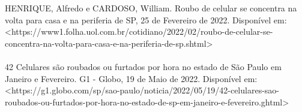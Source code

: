 

\noindent
HENRIQUE, Alfredo e CARDOSO, William. Roubo de celular se concentra na volta para casa e na periferia de SP, 25 de Fevereiro de 2022. 
Disponível em: <https://www1.folha.uol.com.br/cotidiano/2022/02/roubo-de-celular-se-concentra-na-volta-para-casa-e-na-periferia-de-sp.shtml> 
\\ \\
42 Celulares são roubados ou furtados por hora no estado de São Paulo em Janeiro e Fevereiro. G1 - Globo, 19 de Maio de 2022.
Disponível em: <https://g1.globo.com/sp/sao-paulo/noticia/2022/05/19/42-celulares-sao-roubados-ou-furtados-por-hora-no-estado-de-sp-em-janeiro-e-fevereiro.ghtml>